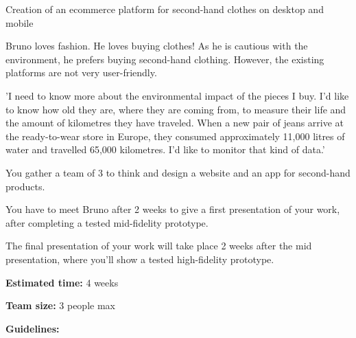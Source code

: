 \makeheaderfiles

Creation of an ecommerce platform for second-hand clothes on desktop and mobile

Bruno loves fashion. He loves buying clothes! As he is cautious with the environment, he prefers buying second-hand clothing. However, the existing platforms are not very user-friendly.

'I need to know more about the environmental impact of the pieces I buy. I'd like to know how old they are, where they are coming from, to measure their life and the amount of kilometres they have traveled. When a new pair of jeans arrive at the ready-to-wear store in Europe, they consumed approximately 11,000 litres of water and travelled 65,000 kilometres. I'd like to monitor that kind of data.'

You gather a team of 3 to think and design a website and an app for second-hand products.

You have to meet Bruno after 2 weeks to give a first presentation of your work, after completing a tested mid-fidelity prototype.

The final presentation of your work will take place 2 weeks after the mid presentation, where you'll show a tested high-fidelity prototype.

\textbf{Estimated time:} 4 weeks

\textbf{Team size:} 3 people max

\textbf{Guidelines:}

